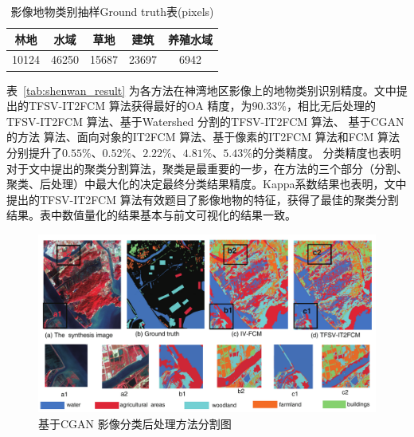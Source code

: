 \begin{table}[htb]
    \caption{影像地物类别抽样Ground truth表(pixels)}\label{tab:shenwan_data}
    \centering
    \begin{tabular}{ccccc}
        \toprule
        林地  & 水域  & 草地  & 建筑  & 养殖水域 \\
        \midrule
        10124 & 46250 & 15687 & 23697 & 6942     \\
        \bottomrule
    \end{tabular}
\end{table}


表~\ref{tab:shenwan_result} 为各方法在神湾地区影像上的地物类别识别精度。文中提出的TFSV-IT2FCM 算法获得最好的OA 精度，为$90.33\%$，相比无后处理的TFSV-IT2FCM 算法、基于Watershed 分割的TFSV-IT2FCM 算法、 基于CGAN 的方法 算法、面向对象的IT2FCM 算法、基于像素的IT2FCM 算法和FCM 算法分别提升了$0.55\%$、$0.52\%$、$2.22\%$、$4.81\%$、$5.43\%$的分类精度。
分类精度也表明对于文中提出的聚类分割算法，聚类是最重要的一步，在方法的三个部分（分割、聚类、后处理）中最大化的决定最终分类结果精度。Kappa系数结果也表明，文中提出的TFSV-IT2FCM 算法有效题目了影像地物的特征，获得了最佳的聚类分割结果。表中数值量化的结果基本与前文可视化的结果一致。

\begin{figure}[htbp]
    \centering
    \includegraphics[width=1.0\textwidth]{figures/hengqin}
    \caption{基于CGAN 影像分类后处理方法分割图 }\label{fig:hengqin}
\end{figure}


